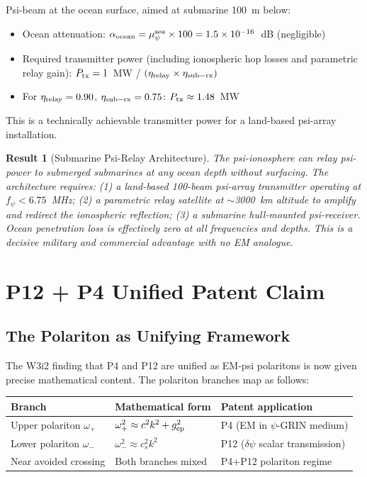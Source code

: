 \documentclass[aps,prd,twocolumn,superscriptaddress]{revtex4-2}
\newtheorem{result}{Result}
\begin{document}
Psi-beam at the ocean surface, aimed at submarine 100~m below:
\begin{itemize}
  \item Ocean attenuation: $\alpha_{\rm ocean} = \mu_\psi^{\rm sea} \times 100
    = 1.5\times10^{-16}$~dB (negligible)
  \item Required transmitter power (including ionospheric hop losses
    and parametric relay gain): $P_{\rm tx} = 1$~MW / $(\eta_{\rm relay}
    \times \eta_{\rm sub-rx})$
  \item For $\eta_{\rm relay} = 0.90$, $\eta_{\rm sub-rx} = 0.75$:
    $P_{\rm tx} \approx 1.48$~MW
\end{itemize}

This is a technically achievable transmitter power for a land-based
psi-array installation.

\begin{result}[Submarine Psi-Relay Architecture]
The psi-ionosphere can relay psi-power to submerged submarines at any
ocean depth without surfacing.  The architecture requires: (1) a
land-based 100-beam psi-array transmitter operating at $f_\psi < 6.75$~MHz;
(2) a parametric relay satellite at $\sim$3000~km altitude to amplify
and redirect the ionospheric reflection; (3) a submarine hull-mounted
psi-receiver.  Ocean penetration loss is effectively zero at all
frequencies and depths.  This is a decisive military and commercial
advantage with no EM analogue.
\end{result}

\section{P12 + P4 Unified Patent Claim}
\label{sec:unified-claim}

\subsection{The Polariton as Unifying Framework}

The W3i2 finding that P4 and P12 are unified as EM-psi polaritons is
now given precise mathematical content.  The polariton branches
map as follows:

\begin{center}
\begin{tabular}{lll}
\hline
Branch & Mathematical form & Patent application \\
\hline
Upper polariton $\omega_+$ & $\omega_+^2 \approx c^2k^2 + g_{\rm ep}^2$ & P4 (EM in $\psi$-GRIN medium) \\
Lower polariton $\omega_-$ & $\omega_-^2 \approx c_s^2 k^2$ & P12 ($\delta\psi$ scalar transmission) \\
Near avoided crossing & Both branches mixed & P4+P12 polariton regime \\
\hline
\end{tabular}
\end{center}
\end{document}
